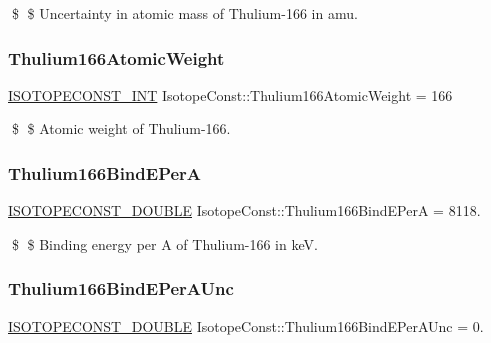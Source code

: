 \$ \$ Uncertainty in atomic mass of Thulium-\/166 in amu. \mbox{\label{group___isotope_const-_thulium-_tm166_ga8e70ff683691488228662cb0ad3498f0}} 
\subsubsection{\texorpdfstring{Thulium166\+Atomic\+Weight}{Thulium166AtomicWeight}}
{\footnotesize\ttfamily \mbox{\hyperlink{group___isotope_const-_macros_ga5f18360b3e99483a35c32d789e62621c}{I\+S\+O\+T\+O\+P\+E\+C\+O\+N\+S\+T\+\_\+\+I\+NT}} Isotope\+Const\+::\+Thulium166\+Atomic\+Weight = 166}

\$ \$ Atomic weight of Thulium-\/166. \mbox{\label{group___isotope_const-_thulium-_tm166_ga2fe4f6351df7ebc59fd7a3fddb06e027}} 
\subsubsection{\texorpdfstring{Thulium166\+Bind\+E\+PerA}{Thulium166BindEPerA}}
{\footnotesize\ttfamily \mbox{\hyperlink{group___isotope_const-_macros_ga8f45a7272ce02c0b4c65c44636ed719a}{I\+S\+O\+T\+O\+P\+E\+C\+O\+N\+S\+T\+\_\+\+D\+O\+U\+B\+LE}} Isotope\+Const\+::\+Thulium166\+Bind\+E\+PerA = 8118.}

\$ \$ Binding energy per A of Thulium-\/166 in keV. \mbox{\label{group___isotope_const-_thulium-_tm166_ga4752692ae509d2ded8661b53ae021a39}} 
\subsubsection{\texorpdfstring{Thulium166\+Bind\+E\+Per\+A\+Unc}{Thulium166BindEPerAUnc}}
{\footnotesize\ttfamily \mbox{\hyperlink{group___isotope_const-_macros_ga8f45a7272ce02c0b4c65c44636ed719a}{I\+S\+O\+T\+O\+P\+E\+C\+O\+N\+S\+T\+\_\+\+D\+O\+U\+B\+LE}} Isotope\+Const\+::\+Thulium166\+Bind\+E\+Per\+A\+Unc = 0.}

